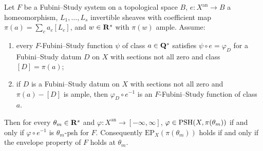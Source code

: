 \begin{lemma}
\label{lem:var-psh-comparison-dictionary}
\leanok
{}
Let $F$ be a Fubini--Study system on a topological space $B$, $e\colon X^{\mathrm{an}}\to B$ a
homeomorphism, $L_1,\dots,L_s$ invertible sheaves with coefficient map
$\pi(a)=\sum_ca_c[L_c]$, and $w\in\mathbf{R}^s$ with $\pi(w)$ ample. Assume:
\begin{enumerate}
\item[(A)] every $F$-Fubini--Study function $\psi$ of class $a\in\mathbf{Q}^s$ satisfies
  $\psi\circ e=\varphi_D$ for a Fubini--Study datum $D$ on $X$ with sections not all zero and
  class $[D]=\pi(a)$;
\item[(B)] if $D$ is a Fubini--Study datum on $X$ with sections not all zero and
  $\pi(a)-[D]$ is ample, then $\varphi_D\circ e^{-1}$ is an $F$-Fubini--Study function of class
  $a$.
\end{enumerate}
Then for every $\theta_m\in\mathbf{R}^s$ and $\varphi\colon X^{\mathrm{an}}\to[-\infty,\infty]$,
$\varphi\in\operatorname{PSH}(X,\pi(\theta_m))$ if and only if $\varphi\circ e^{-1}$ is $\theta_m$-psh for
$F$. Consequently $\mathrm{EP}_X(\pi(\theta_m))$ holds if and only if the envelope property of
$F$ holds at $\theta_m$.
\end{lemma}

